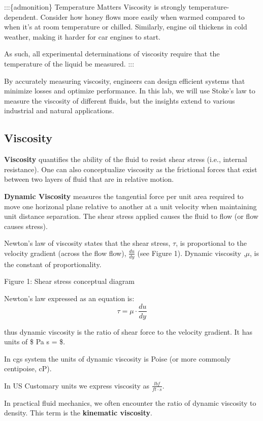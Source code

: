 \documentclass[11pt]{article}
\begin{document}
:::\{admonition\} Temperature Matters Viscosity is strongly
temperature-dependent. Consider how honey flows more easily when warmed
compared to when it's at room temperature or chilled. Similarly, engine
oil thickens in cold weather, making it harder for car engines to start.

As such, all experimental determinations of viscosity require that the
temperature of the liquid be measured. :::

By accurately measuring viscosity, engineers can design efficient
systems that minimize losses and optimize performance. In this lab, we
will use Stoke's law to measure the viscosity of different fluids, but
the insights extend to various industrial and natural applications.

    \hypertarget{viscosity}{%
\subsection{Viscosity}\label{viscosity}}

\textbf{Viscosity} quantifies the ability of the fluid to resist shear
stress (i.e., internal resistance). One can also conceptualize viscosity
as the frictional forces that exist between two layers of fluid that are
in relative motion.

\textbf{Dynamic Viscosity} measures the tangential force per unit area
required to move one horizonal plane relative to another at a unit
velocity when maintaining unit distance separation. The shear stress
applied causes the fluid to flow (or flow causes stress).

Newton's law of viscosity states that the shear stress, \(\tau\), is
proportional to the velocity gradient (across the flow flow),
\(\frac{du}{dy}\) (see Figure 1). Dynamic viscosity ,\(\mu\), is the
constant of proportionality.

Figure 1: Shear stress conceptual diagram

Newton's law expressed as an equation is:
\[\tau = \mu \cdot \frac{du}{dy} \]

thus dynamic viscosity is the ratio of shear force to the velocity
gradient. It has units of \$ Pa \cdot s = 
\cdot {}\$.

In cgs system the units of dynamic viscosity is Poise (or more commonly
centipoise, cP).

In US Customary units we express viscosity as
\(\frac{lbf}{ft \cdot s}\).

In practical fluid mechanics, we often encounter the ratio of dynamic
viscosity to density. This term is the \textbf{kinematic viscosity}.
\end{document}
